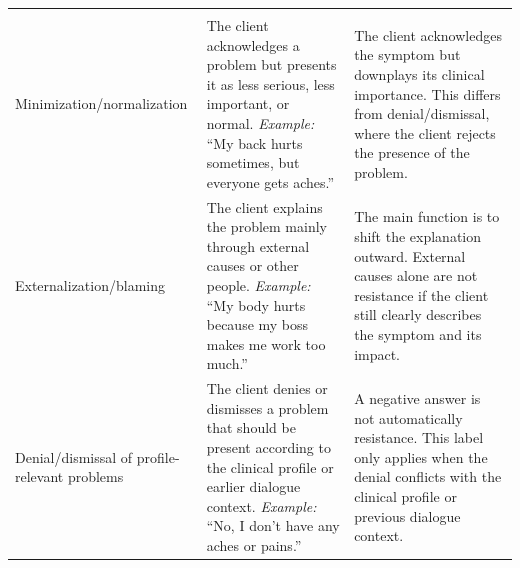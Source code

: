 \begin{table}[tb]
\begin{tabularx}{\textwidth}{@{}p{}p{}X@{}}
        \addlinespace[4pt]
        \rowcolor{black!5}
        \multicolumn{3}{@{}l}{\textit{Reframing}} \\
        \addlinespace[2pt]
        Minimization/\allowbreak normalization &
        The client acknowledges a problem but presents it as less serious, less important, or normal. \textit{Example:} ``My back hurts sometimes, but everyone gets aches.'' &
        The client acknowledges the symptom but downplays its clinical importance. This differs from denial/dismissal, where the client rejects the presence of the problem. \\
        Externalization/\allowbreak blaming &
        The client explains the problem mainly through external causes or other people. \textit{Example:} ``My body hurts because my boss makes me work too much.'' &
        The main function is to shift the explanation outward. External causes alone are not resistance if the client still clearly describes the symptom and its impact. \\
        Denial/dismissal of profile-relevant problems &
        The client denies or dismisses a problem that should be present according to the clinical profile or earlier dialogue context. \textit{Example:} ``No, I don't have any aches or pains.'' &
        A negative answer is not automatically resistance. This label only applies when the denial conflicts with the clinical profile or previous dialogue context. \\

        \bottomrule
    \end{tabularx}
\end{table}

